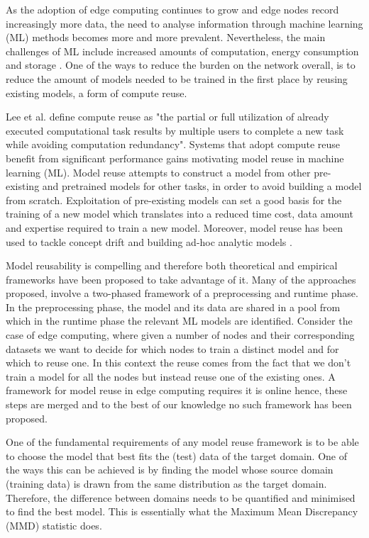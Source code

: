 \documentclass{mpaper}
\begin{document}
As the adoption of edge computing continues to grow and edge nodes record increasingly more data, the need to analyse information through machine learning (ML) methods \cite{ECDeepLearning, ECAI} becomes more and more prevalent. Nevertheless, the main challenges of ML include increased amounts of computation, energy consumption and storage \cite{MLChallenges}.  One of the ways to reduce the burden on the network overall, is to reduce the amount of models needed to be trained in the first place by reusing existing models, a form of compute reuse. 

Lee et al. \cite{ComputeReuse} define compute reuse as "the partial or full utilization of already executed computational task results by multiple users to complete a new task while avoiding computation redundancy".  Systems that adopt compute reuse benefit from significant performance gains motivating model reuse in machine learning (ML). Model reuse \cite{Learnware} attempts to construct a model from other pre-existing and pretrained models for other tasks, in order to avoid building a model from scratch. Exploitation of pre-existing models can set a good basis for the training of a new model which translates into a reduced time cost, data amount and expertise required to train a new model. Moreover, model reuse has been used to tackle concept drift \cite{ConceptDrift} and building ad-hoc analytic models \cite{MaterializationReuse}.

Model reusability is compelling and therefore both theoretical \cite{Learnware} and empirical \cite{MaterializationReuse, KernelMMD}  frameworks have been proposed to take advantage of it. Many of the approaches proposed, involve a two-phased framework of a preprocessing and runtime phase. In the preprocessing phase, the model and its data are shared in a pool from which in the runtime phase the relevant ML models are identified. Consider the case of edge computing, where given a number of nodes and their corresponding datasets we want to decide for which nodes to train a distinct model and for which to reuse one. In this context the reuse comes from the fact that we don’t train a model for all the nodes but instead reuse one of the existing ones. A framework for model reuse in edge computing requires it is online hence, these steps are merged and to the best of our knowledge no such framework has been proposed.

One of the fundamental requirements of any model reuse framework is to be able to choose the model that best fits the (test) data of the target domain. One of the ways this can be achieved is by finding the model whose source domain (training data) is drawn from the same distribution as the target domain. Therefore, the difference between domains needs to be quantified and minimised to find the best model. This is essentially what the Maximum Mean Discrepancy (MMD) \cite{OriginalMMD} statistic does. 
\end{document}
